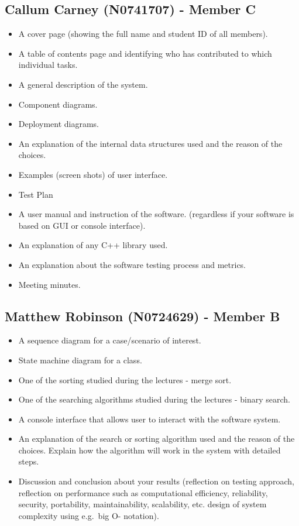 \documentclass[
  english,
  a4paper,
,tablecaptionabove
]{scrartcl}
\providecommand{\tightlist}{%
  \setlength{\itemsep}{0pt}\setlength{\parskip}{0pt}}
\begin{document}
\hypertarget{callum-carney-n0741707---member-c}{%
\subsection{Callum Carney (N0741707) - Member
C}\label{callum-carney-n0741707---member-c}}

\begin{itemize}
\tightlist
\item
  A cover page (showing the full name and student ID of all members).
\item
  A table of contents page and identifying who has contributed to which
  individual tasks.
\item
  A general description of the system.
\item
  Component diagrams.
\item
  Deployment diagrams.
\item
  An explanation of the internal data structures used and the reason of
  the choices.
\item
  Examples (screen shots) of user interface.
\item
  Test Plan
\item
  A user manual and instruction of the software. (regardless if your
  software is based on GUI or console interface).
\item
  An explanation of any C++ library used.
\item
  An explanation about the software testing process and metrics.
\item
  Meeting minutes.
\end{itemize}

\hypertarget{matthew-robinson-n0724629---member-b}{%
\subsection{Matthew Robinson (N0724629) - Member
B}\label{matthew-robinson-n0724629---member-b}}

\begin{itemize}
\tightlist
\item
  A sequence diagram for a case/scenario of interest.
\item
  State machine diagram for a class.
\item
  One of the sorting studied during the lectures - merge sort.
\item
  One of the searching algorithms studied during the lectures - binary
  search.
\item
  A console interface that allows user to interact with the software
  system.
\item
  An explanation of the search or sorting algorithm used and the reason
  of the choices. Explain how the algorithm will work in the system with
  detailed steps.
\item
  Discussion and conclusion about your results (reflection on testing
  approach, reflection on performance such as computational efficiency,
  reliability, security, portability, maintainability, scalability, etc.
  design of system complexity using e.g.~big O- notation).
\end{itemize}
\end{document}
